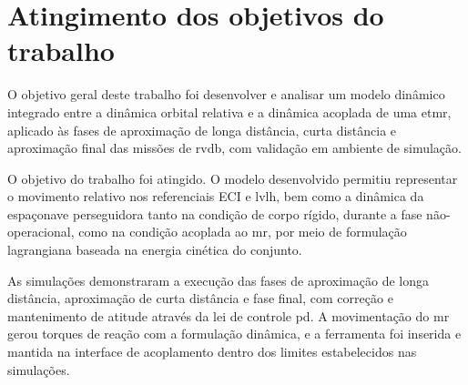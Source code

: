 \section{Atingimento dos objetivos do trabalho}

O objetivo geral deste trabalho foi desenvolver e analisar um modelo dinâmico integrado entre a dinâmica orbital relativa e a dinâmica acoplada de uma \gls{etmr}, aplicado às fases de aproximação de longa distância, curta distância e aproximação final das missões de \gls{rvdb}, com validação em ambiente de simulação.

O objetivo do trabalho foi atingido.
O modelo desenvolvido permitiu representar o movimento relativo nos referenciais ECI e \gls{lvlh}, bem como a dinâmica da espaçonave perseguidora tanto na condição de corpo rígido, durante a fase não-operacional, como na condição acoplada ao \gls{mr}, por meio de formulação lagrangiana baseada na energia cinética do conjunto.

As simulações demonstraram a execução das fases de aproximação de longa distância, aproximação de curta distância e fase final, com correção e mantenimento de atitude através da lei de controle \gls{pd}.
A movimentação do \gls{mr} gerou torques de reação com a formulação dinâmica, e a ferramenta foi inserida e mantida na interface de acoplamento dentro dos limites estabelecidos nas simulações.